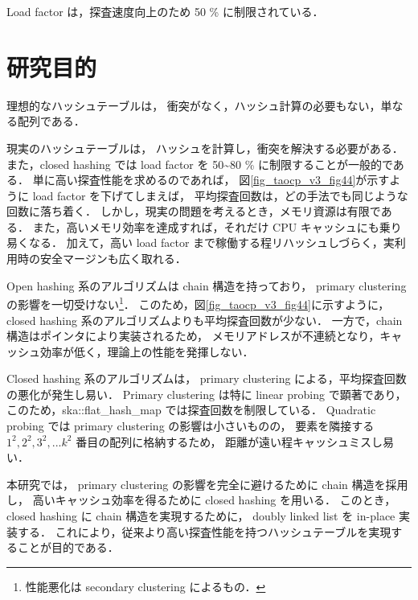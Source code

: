 Load factor は，探査速度向上のため 50 \% に制限されている．

\section{研究目的}
理想的なハッシュテーブルは，
衝突がなく，ハッシュ計算の必要もない，単なる配列である．

現実のハッシュテーブルは，
ハッシュを計算し，衝突を解決する必要がある．
また，closed hashing では load factor を 50\textasciitilde 80 \% に制限することが一般的である．
単に高い探査性能を求めるのであれば，
図\ref{fig_taocp_v3_fig44}が示すように load factor を下げてしまえば，
平均探査回数は，どの手法でも同じような回数に落ち着く．
しかし，現実の問題を考えるとき，メモリ資源は有限である．
また，高いメモリ効率を達成すれば，それだけ CPU キャッシュにも乗り易くなる．
加えて，高い load factor まで稼働する程リハッシュしづらく，実利用時の安全マージンも広く取れる．

Open hashing 系のアルゴリズムは chain 構造を持っており，
primary clustering の影響を一切受けない\footnote{性能悪化は secondary clustering によるもの．}．
このため，図\ref{fig_taocp_v3_fig44}に示すように，
closed hashing 系のアルゴリズムよりも平均探査回数が少ない．
一方で，chain 構造はポインタにより実装されるため，
メモリアドレスが不連続となり，キャッシュ効率が低く，理論上の性能を発揮しない．

Closed hashing 系のアルゴリズムは，
primary clustering による，平均探査回数の悪化が発生し易い．
Primary clustering は特に linear probing で顕著であり，
このため，ska::flat\_hash\_map では探査回数を制限している．
Quadratic probing では primary clustering の影響は小さいものの，
要素を隣接する $1^2, 2^2, 3^2, ... k^2$ 番目の配列に格納するため，
距離が遠い程キャッシュミスし易い．

本研究では，
primary clustering の影響を完全に避けるために chain 構造を採用し，
高いキャッシュ効率を得るために closed hashing を用いる．
このとき，closed hashing に chain 構造を実現するために，
doubly linked list を in-place 実装する．
これにより，従来より高い探査性能を持つハッシュテーブルを実現することが目的である．




